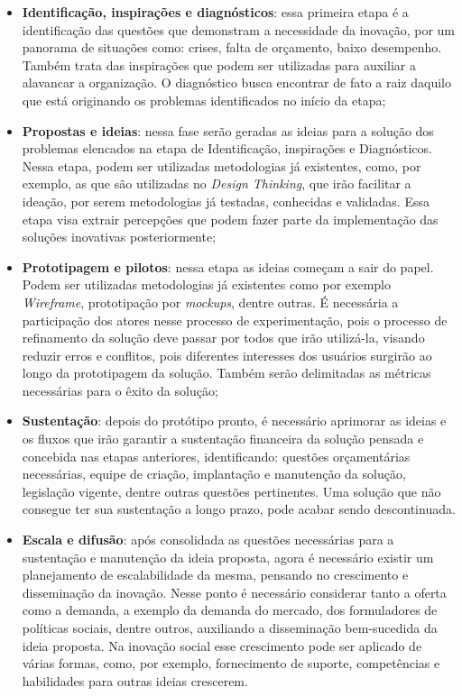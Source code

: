 \begin{itemize}
    \item \textbf{Identificação, inspirações e diagnósticos}: essa primeira etapa é a identificação das questões que demonstram a necessidade da inovação, por um panorama de situações como: crises, falta de orçamento, baixo desempenho. Também trata das inspirações que podem ser utilizadas para auxiliar a alavancar a organização. O diagnóstico busca encontrar de fato a raiz daquilo que está originando os problemas identificados no início da etapa;
    \item \textbf{Propostas e ideias}: nessa fase serão geradas as ideias para a solução dos problemas elencados na etapa de Identificação, inspirações e Diagnósticos. Nessa etapa, podem ser utilizadas metodologias já existentes, como, por exemplo, as que são utilizadas no \textit{Design Thinking}, que irão facilitar a ideação, por serem metodologias já testadas, conhecidas e validadas. Essa etapa visa extrair percepções que podem fazer parte da implementação das soluções inovativas posteriormente;
    \item \textbf{Prototipagem e pilotos}: nessa etapa as ideias começam a sair do papel. Podem ser utilizadas metodologias já existentes como por exemplo \textit{Wireframe}, prototipação por \textit{mockups}, dentre outras. É necessária a participação dos atores nesse processo de experimentação, pois o processo de refinamento da solução deve passar por todos que irão utilizá-la, visando reduzir erros e conflitos, pois diferentes interesses dos usuários surgirão ao longo da prototipagem da solução. Também serão delimitadas as métricas necessárias para o êxito da solução;
    \item \textbf{Sustentação}: depois do protótipo pronto, é necessário aprimorar as ideias e os fluxos que irão garantir a sustentação financeira da solução pensada e concebida nas etapas anteriores, identificando: questões orçamentárias necessárias, equipe de criação, implantação e manutenção da solução, legislação vigente, dentre outras questões pertinentes. Uma solução que não consegue ter sua sustentação a longo prazo, pode acabar sendo descontinuada.
    \item \textbf{Escala e difusão}: após consolidada as questões necessárias para a sustentação e manutenção da ideia proposta, agora é necessário existir um planejamento de escalabilidade da mesma, pensando no crescimento e disseminação da inovação. Nesse ponto é necessário considerar tanto a oferta como a demanda, a exemplo da demanda do mercado, dos formuladores de políticas sociais, dentre outros, auxiliando a disseminação bem-sucedida da ideia proposta. Na inovação social esse crescimento pode ser aplicado de várias formas, como, por exemplo, fornecimento de suporte, competências e habilidades para outras ideias crescerem.

\end{itemize}

